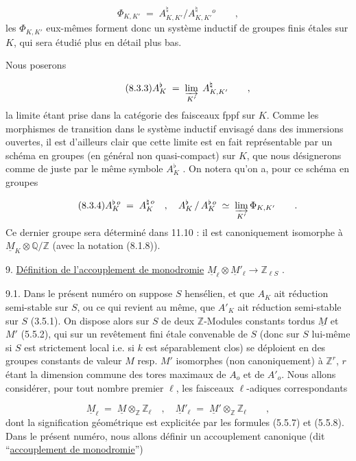 \begin{equation}\tag{8.3.2}
\Phi_{K,K'} \;=\; A^{\natural}_{K,K'}/A^{\natural}_{K,K'}{}^{o} \qquad ,
\end{equation}
les $\Phi_{K,K'}$ eux-mêmes forment donc un système inductif de groupes finis étales sur $K$, qui sera étudié plus en détail plus bas.

Nous poserons

\begin{equation}\tag{8.3.3}
A^{\flat}_{K} \;=\; \varinjlim_{K'} \; A^{\natural}_{K,K'} \qquad ,
\end{equation}
la limite étant prise dans la catégorie des faisceaux fppf sur $K$. Comme les morphismes de transition dans le système inductif envisagé dans des immersions ouvertes, il est d'ailleurs clair que cette limite est en fait représentable par un schéma en groupes (en général non quasi-compact) sur $K$, que nous désignerons comme de juste par le même symbole $A^{\flat}_{K}$ . On notera qu'on a, pour ce schéma en groupes

\begin{equation}\tag{8.3.4}
A_{K}^{\flat\,o} \;=\; A_{K}^{\natural\,o} \quad , \quad A^{\flat}_{K} \,/\, A_{K}^{\flat\,o} \;\simeq\; \varinjlim_{K'} \Phi_{K,K'} \qquad .
\end{equation}
Ce dernier groupe sera déterminé dans 11.10 : il est canoniquement isomorphe à $\underline{M}_{K}\otimes\mathbb{Q}/\mathbb{Z}$ (avec la notation (8.1.8)).




9. \underline{Définition de l'accouplement de monodromie} $\underline{M}_{\ell}\otimes\underline{M}'_{\ell} \longrightarrow \mathbb{Z}_{\ell S}$ .

9.1. Dans le présent numéro on suppose $S$ hensélien, et que $A_{K}$ ait réduction semi-stable sur $S$, ou ce qui revient au même, que $A'_{K}$ ait réduction semi-stable sur $S$ (3.5.1). On dispose alors sur $S$ de deux $\mathbb{Z}$-Modules constants tordus $\underline{M}$ et $M'$ (5.5.2), qui sur un revêtement fini étale convenable de $S$ (donc sur $S$ lui-même si $S$ est strictement local i.e. si $k$ est séparablement clos) se déploient en des groupes constants de valeur $M$ resp. $M'$ isomorphes (non canoniquement) à $\mathbb{Z}^{r}$, $r$ étant la dimension commune des tores maximaux de $A_{o}$ et de $A'_{o}$. Nous allons considérer, pour tout nombre premier $\ell$, les faisceaux $\ell$-adiques correspondants

\begin{equation}\tag{9.1.1}
\underline{M}_{\ell} \;=\; \underline{M}\otimes_{\mathbb{Z}}\mathbb{Z}_{\ell} \quad , \quad \underline{M}'_{\ell} \;=\; \underline{M}'\otimes_{\mathbb{Z}}\mathbb{Z}_{\ell} \qquad ,
\end{equation}
dont la signification géométrique est explicitée par les formules (5.5.7) et (5.5.8). Dans le présent numéro, nous allons définir un accouplement canonique (dit ``\underline{accouplement de monodromie}'')

